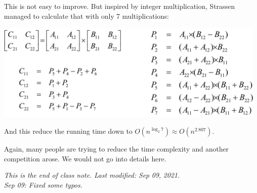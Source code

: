 \documentclass[11pt, a4paper]{COMP3711}
\begin{document}
\begin{spacing}{1.5}
    This is not easy to improve. But inspired by integer multiplication,
    Strassen managed to calculate that with only 7 multiplications:
    \begin{center}
        \includegraphics[scale=0.23]{images/02-matrix-mult.jpg}
    \end{center}
    
    And this reduce the running time down to 
    $O(n^{\log_2 7})\approx O(n^{2.807})$.

    Again, many people are trying to reduce the time complexity 
    and another competition arose. 
    We would not go into details here.

    {\it This is the end of class note. Last modified: Sep 09, 2021.\\
    Sep 09: Fixed some typos.}


\end{spacing}
\end{document}
